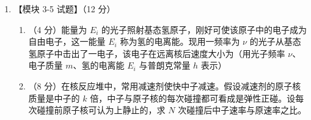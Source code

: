 \documentclass[\gkver]{gaokaozhenti}
\begin{document}
\begin{enumerate}
{式中 $v=340\Ums$ 是空气中的声速。在右图中，O 是 AB 的中点，P 是 OB 上任一点。将 $S_{1}P-S_{2}P$ 表示为
$S_{1}P-S_{2}P=k\frac{\lambda}{2}$ ②

式中 $k$ 为实数，当 $k=0,2,4\cdots$ 时，从两个喇叭来的声波因干涉而加强；当 $k=1,3,5\cdots$ 时，从两个喇叭来的声波因干涉而相消。由此可知，O 是干涉加强点；对于 B 点，
$S_{1}B-S_{2}B=(20-15)\Um=4\frac{1}{2}\lambda$ ③

所以，B 点也是干涉加强点。因而 O、B 之间有两个干涉相消点，由对称性可知，AB 上有 4 个干涉相消点。

}

\item
【模块 3-5 试题】（12 分）

\begin{enumerate}
	\item
	（4 分）能量为 $E_{i}$ 的光子照射基态氢原子，刚好可使该原子中的电子成为自由电子，这一能量 $E_{i}$ 称为氢的电离能。现用一频率为 $\nu$ 的光子从基态氢原子中击出了一电子，该电子在远离核后速度大小为（用光子频率 $\nu$、电子质量 $m$、氢的电离能 $E_{i}$ 与普朗克常量 $h$ 表示）
	\item
	（8 分）在核反应堆中，常用减速剂使快中子减速。假设减速剂的原子核质量是中子的 $k$ 倍，中子与原子核的每次碰撞都可看成是弹性正碰。设每次碰撞前原子核可认为上静止的，求 $N$ 次碰撞后中子速率与原速率之比。
\end{enumerate}


\end{enumerate}
\end{document}
